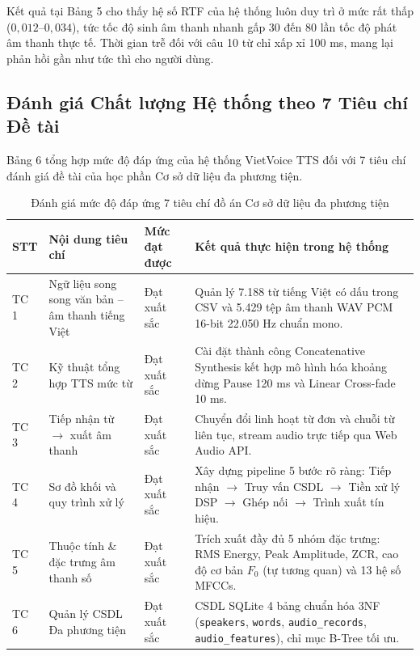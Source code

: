 Kết quả tại Bảng 5 cho thấy hệ số RTF của hệ thống luôn duy trì ở mức rất thấp ($0{,}012\text{--}0{,}034$), tức tốc độ sinh âm thanh nhanh gấp 30 đến 80 lần tốc độ phát âm thanh thực tế. Thời gian trễ đối với câu 10 từ chỉ xấp xỉ 100 ms, mang lại phản hồi gần như tức thì cho người dùng.

\subsection{Đánh giá Chất lượng Hệ thống theo 7 Tiêu chí Đề tài}

Bảng 6 tổng hợp mức độ đáp ứng của hệ thống VietVoice TTS đối với 7 tiêu chí đánh giá đề tài của học phần Cơ sở dữ liệu đa phương tiện.

\begin{table}[H]
\centering
\caption{Đánh giá mức độ đáp ứng 7 tiêu chí đồ án Cơ sở dữ liệu đa phương tiện}
\label{tab:criteria_eval}
\vspace{2pt}
\begin{tabularx}{\textwidth}{p{1.2cm}p{4.6cm}p{2.4cm}X}
\toprule
\textbf{STT} & \textbf{Nội dung tiêu chí} & \textbf{Mức đạt được} & \textbf{Kết quả thực hiện trong hệ thống} \\
\midrule
TC 1 & Ngữ liệu song song văn bản -- âm thanh tiếng Việt & Đạt xuất sắc & Quản lý 7.188 từ tiếng Việt có dấu trong CSV và 5.429 tệp âm thanh WAV PCM 16-bit 22.050 Hz chuẩn mono. \\
\addlinespace
TC 2 & Kỹ thuật tổng hợp TTS mức từ & Đạt xuất sắc & Cài đặt thành công Concatenative Synthesis kết hợp mô hình hóa khoảng dừng Pause 120 ms và Linear Cross-fade 10 ms. \\
\addlinespace
TC 3 & Tiếp nhận từ $\to$ xuất âm thanh & Đạt xuất sắc & Chuyển đổi linh hoạt từ đơn và chuỗi từ liên tục, stream audio trực tiếp qua Web Audio API. \\
\addlinespace
TC 4 & Sơ đồ khối và quy trình xử lý & Đạt xuất sắc & Xây dựng pipeline 5 bước rõ ràng: Tiếp nhận $\to$ Truy vấn CSDL $\to$ Tiền xử lý DSP $\to$ Ghép nối $\to$ Trình xuất tín hiệu. \\
\addlinespace
TC 5 & Thuộc tính \& đặc trưng âm thanh số & Đạt xuất sắc & Trích xuất đầy đủ 5 nhóm đặc trưng: RMS Energy, Peak Amplitude, ZCR, cao độ cơ bản $F_0$ (tự tương quan) và 13 hệ số MFCCs. \\
\addlinespace
TC 6 & Quản lý CSDL Đa phương tiện & Đạt xuất sắc & CSDL SQLite 4 bảng chuẩn hóa 3NF (\texttt{speakers}, \texttt{words}, \texttt{audio\_records}, \texttt{audio\_features}), chỉ mục B-Tree tối ưu. \\

\end{tabularx}
\end{table}
